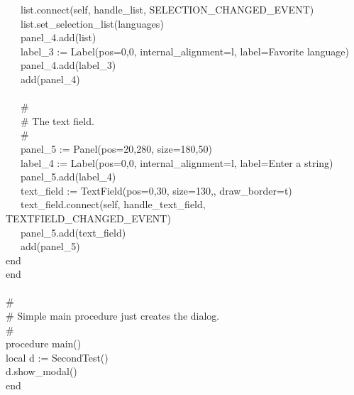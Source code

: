 {\>   \ \ \ list.connect(self,
{\textquotedbl}handle\_list{\textquotedbl}, SELECTION\_CHANGED\_EVENT) \\
\>   \ \ \ list.set\_selection\_list(languages) \\
\>   \ \ \ panel\_4.add(list) \\
\>   \ \ \ label\_3 := Label({\textquotedbl}pos=0,0{\textquotedbl},
{\textquotedbl}internal\_alignment=l{\textquotedbl},
{\textquotedbl}label=Favorite language{\textquotedbl}) \\
\>   \ \ \ panel\_4.add(label\_3) \\
\>   \ \ \ add(panel\_4) \\
\ \\
\>   \ \ \ \# \\
\>   \ \ \ \# The text field. \\
\>   \ \ \ \# \\
\>   \ \ \ panel\_5 := Panel({\textquotedbl}pos=20,280{\textquotedbl},
{\textquotedbl}size=180,50{\textquotedbl}) \\
\>   \ \ \ label\_4 := Label({\textquotedbl}pos=0,0{\textquotedbl},
{\textquotedbl}internal\_alignment=l{\textquotedbl},
{\textquotedbl}label=Enter a string{\textquotedbl}) \\
\>   \ \ \ panel\_5.add(label\_4) \\
\>   \ \ \ text\_field :=
TextField({\textquotedbl}pos=0,30{\textquotedbl},
{\textquotedbl}size=130,{\textquotedbl},
{\textquotedbl}draw\_border=t{\textquotedbl}) \\
\>   \ \ \ text\_field.connect(self,
{\textquotedbl}handle\_text\_field{\textquotedbl},
TEXTFIELD\_CHANGED\_EVENT) \\
\>   \ \ \ panel\_5.add(text\_field) \\
\>   \ \ \ add(panel\_5) \\
\>   end \\
end \\
\ \\
\# \\
\# Simple main procedure just creates the dialog. \\
\# \\
procedure main() \\
\>   local d := SecondTest() \\
\>   d.show\_modal() \\
end
}

\bigskip

